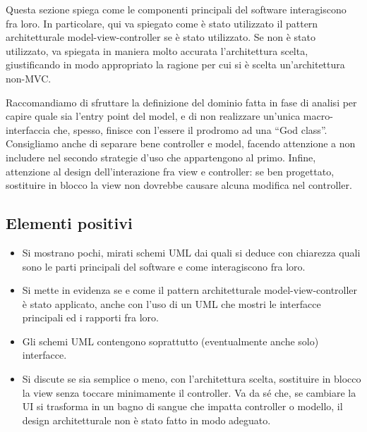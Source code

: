 \documentclass[a4paper,12pt]{report}
\begin{document}
Questa sezione spiega come le componenti principali del software interagiscono fra loro.
%
In particolare, qui va spiegato come è stato utilizzato il pattern architetturale model-view-controller se è stato utilizzato.
%
Se non è stato utilizzato, va spiegata in maniera molto accurata l'architettura scelta, giustificando in modo appropriato la ragione per cui si è scelta un'architettura non-MVC.

Raccomandiamo di sfruttare la definizione del dominio fatta in fase di analisi per capire quale sia l'entry point del model, e di non realizzare un'unica macro-interfaccia che, spesso, finisce con l'essere il prodromo ad una ``God class''.
%
Consigliamo anche di separare bene controller e model, facendo attenzione a non includere nel secondo strategie d'uso che appartengono al primo.
%
Infine, attenzione al design dell'interazione fra view e controller: se ben progettato, sostituire in blocco la view non dovrebbe causare alcuna modifica nel controller.

\subsection*{Elementi positivi}
\begin{itemize}
 \item Si mostrano pochi, mirati schemi UML dai quali si deduce con chiarezza quali sono le parti principali del software e come interagiscono fra loro.
 \item Si mette in evidenza se e come il pattern architetturale model-view-controller è stato applicato, anche con l'uso di un UML che mostri le interfacce principali ed i rapporti fra loro.
 \item Gli schemi UML contengono soprattutto (eventualmente anche solo) interfacce.
 \item Si discute se sia semplice o meno, con l'architettura scelta, sostituire in blocco la view senza toccare minimamente il controller. Va da sé che, se cambiare la UI si trasforma in un bagno di sangue che impatta controller o modello, il design architetturale non è stato fatto in modo adeguato.
\end{itemize}
\end{document}
